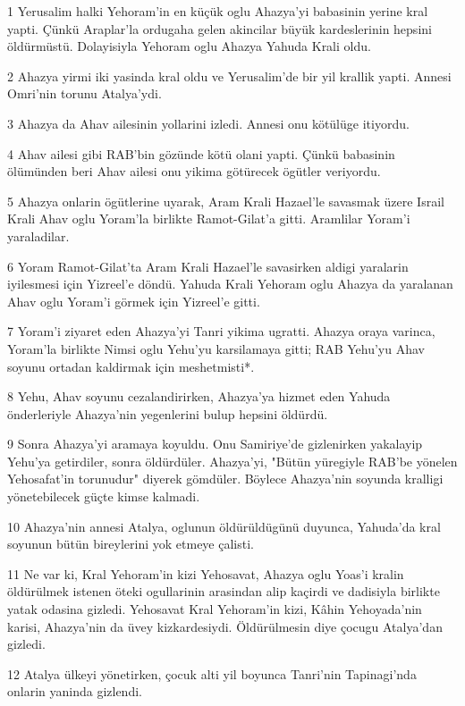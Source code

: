 \par 1 Yerusalim halki Yehoram'in en küçük oglu Ahazya'yi babasinin yerine kral yapti. Çünkü Araplar'la ordugaha gelen akincilar büyük kardeslerinin hepsini öldürmüstü. Dolayisiyla Yehoram oglu Ahazya Yahuda Krali oldu.
\par 2 Ahazya yirmi iki yasinda kral oldu ve Yerusalim'de bir yil krallik yapti. Annesi Omri'nin torunu Atalya'ydi.
\par 3 Ahazya da Ahav ailesinin yollarini izledi. Annesi onu kötülüge itiyordu.
\par 4 Ahav ailesi gibi RAB'bin gözünde kötü olani yapti. Çünkü babasinin ölümünden beri Ahav ailesi onu yikima götürecek ögütler veriyordu.
\par 5 Ahazya onlarin ögütlerine uyarak, Aram Krali Hazael'le savasmak üzere Israil Krali Ahav oglu Yoram'la birlikte Ramot-Gilat'a gitti. Aramlilar Yoram'i yaraladilar.
\par 6 Yoram Ramot-Gilat'ta Aram Krali Hazael'le savasirken aldigi yaralarin iyilesmesi için Yizreel'e döndü. Yahuda Krali Yehoram oglu Ahazya da yaralanan Ahav oglu Yoram'i görmek için Yizreel'e gitti.
\par 7 Yoram'i ziyaret eden Ahazya'yi Tanri yikima ugratti. Ahazya oraya varinca, Yoram'la birlikte Nimsi oglu Yehu'yu karsilamaya gitti; RAB Yehu'yu Ahav soyunu ortadan kaldirmak için meshetmisti*.
\par 8 Yehu, Ahav soyunu cezalandirirken, Ahazya'ya hizmet eden Yahuda önderleriyle Ahazya'nin yegenlerini bulup hepsini öldürdü.
\par 9 Sonra Ahazya'yi aramaya koyuldu. Onu Samiriye'de gizlenirken yakalayip Yehu'ya getirdiler, sonra öldürdüler. Ahazya'yi, "Bütün yüregiyle RAB'be yönelen Yehosafat'in torunudur" diyerek gömdüler. Böylece Ahazya'nin soyunda kralligi yönetebilecek güçte kimse kalmadi.
\par 10 Ahazya'nin annesi Atalya, oglunun öldürüldügünü duyunca, Yahuda'da kral soyunun bütün bireylerini yok etmeye çalisti.
\par 11 Ne var ki, Kral Yehoram'in kizi Yehosavat, Ahazya oglu Yoas'i kralin öldürülmek istenen öteki ogullarinin arasindan alip kaçirdi ve dadisiyla birlikte yatak odasina gizledi. Yehosavat Kral Yehoram'in kizi, Kâhin Yehoyada'nin karisi, Ahazya'nin da üvey kizkardesiydi. Öldürülmesin diye çocugu Atalya'dan gizledi.
\par 12 Atalya ülkeyi yönetirken, çocuk alti yil boyunca Tanri'nin Tapinagi'nda onlarin yaninda gizlendi.

